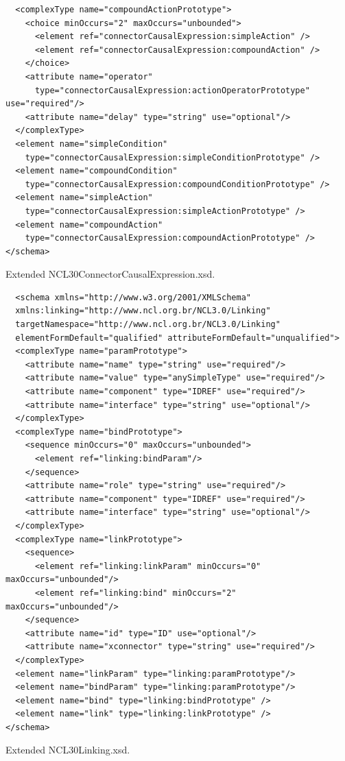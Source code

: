 \documentclass[
  doutorado,
  american
]{ThesisPUC}
\begin{document}
\begin{listing}[!ht]
\begin{verbatim}
  <complexType name="compoundActionPrototype">
    <choice minOccurs="2" maxOccurs="unbounded">
      <element ref="connectorCausalExpression:simpleAction" />
      <element ref="connectorCausalExpression:compoundAction" />
    </choice>
    <attribute name="operator" 
      type="connectorCausalExpression:actionOperatorPrototype" use="required"/>
    <attribute name="delay" type="string" use="optional"/>
  </complexType>
  <element name="simpleCondition" 
    type="connectorCausalExpression:simpleConditionPrototype" />
  <element name="compoundCondition"  
    type="connectorCausalExpression:compoundConditionPrototype" />
  <element name="simpleAction"  
    type="connectorCausalExpression:simpleActionPrototype" />
  <element name="compoundAction"  
    type="connectorCausalExpression:compoundActionPrototype" />
</schema>
\end{verbatim}
\caption{Extended NCL30ConnectorCausalExpression.xsd.}
\label{list:annexa4}
\end{listing}

\begin{listing}[!ht]
\begin{verbatim}
  <schema xmlns="http://www.w3.org/2001/XMLSchema"
  xmlns:linking="http://www.ncl.org.br/NCL3.0/Linking"
  targetNamespace="http://www.ncl.org.br/NCL3.0/Linking"
  elementFormDefault="qualified" attributeFormDefault="unqualified">
  <complexType name="paramPrototype">
    <attribute name="name" type="string" use="required"/>
    <attribute name="value" type="anySimpleType" use="required"/>
    <attribute name="component" type="IDREF" use="required"/>
    <attribute name="interface" type="string" use="optional"/>
  </complexType>
  <complexType name="bindPrototype">
    <sequence minOccurs="0" maxOccurs="unbounded">
      <element ref="linking:bindParam"/>
    </sequence>
    <attribute name="role" type="string" use="required"/>
    <attribute name="component" type="IDREF" use="required"/>
    <attribute name="interface" type="string" use="optional"/>
  </complexType>
  <complexType name="linkPrototype">
    <sequence>
      <element ref="linking:linkParam" minOccurs="0" maxOccurs="unbounded"/>
      <element ref="linking:bind" minOccurs="2" maxOccurs="unbounded"/>
    </sequence>
    <attribute name="id" type="ID" use="optional"/>
    <attribute name="xconnector" type="string" use="required"/>
  </complexType>
  <element name="linkParam" type="linking:paramPrototype"/>
  <element name="bindParam" type="linking:paramPrototype"/>
  <element name="bind" type="linking:bindPrototype" />
  <element name="link" type="linking:linkPrototype" />
</schema>
\end{verbatim}
\caption{ Extended NCL30Linking.xsd.}
\label{list:annexa5}
\end{listing}
\end{document}
